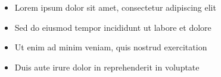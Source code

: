 \begin{itemize}
    \item \textbf{} Lorem ipsum dolor sit amet, consectetur adipiscing elit
    \item \textbf{} Sed do eiusmod tempor incididunt ut labore et dolore
    \item \textbf{} Ut enim ad minim veniam, quis nostrud exercitation
    \item \textbf{} Duis aute irure dolor in reprehenderit in voluptate
\end{itemize}
